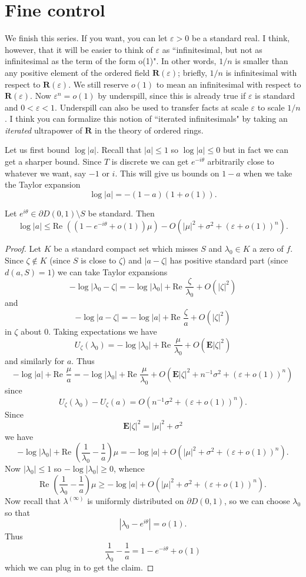 \documentclass[12pt]{article}
\begin{document}
\section{Fine control}
We finish this series.
If you want, you can let $\varepsilon > 0$ be a standard real.
I think, however, that it will be easier to think of $\varepsilon$ as ``infinitesimal, but not as infinitesimal as the term of the form o(1)".
In other words, $1/n$ is smaller than any positive element of the ordered field $\mathbf R(\varepsilon)$; briefly, $1/n$ is infinitesimal with respect to $\mathbf R(\varepsilon)$.
We still reserve $o(1)$ to mean an infinitesimal with respect to $\mathbf R(\varepsilon)$.
Now $\varepsilon^n = o(1)$ by underspill, since this is already true if $\varepsilon$ is standard and $0 < \varepsilon < 1$.
Underspill can also be used to transfer facts at scale $\varepsilon$ to scale $1/n$.
I think you can formalize this notion of ``iterated infinitesimals" by taking an \emph{iterated} ultrapower of $\mathbf R$ in the theory of ordered rings.

Let us first bound $\log |a|$. Recall that $|a| \leq 1$ so $\log |a| \leq 0$ but in fact we can get a sharper bound.
Since $T$ is discrete we can get $e^{-i\theta}$ arbitrarily close to whatever we want, say $-1$ or $i$.
This will give us bounds on $1 - a$ when we take the Taylor expansion
$$\log|a| = -(1 - a)(1 + o(1)).$$
\begin{lemma}
Let $e^{i\theta} \in \partial D(0, 1) \setminus S$ be standard. Then
$$\log |a| \leq \text{Re } ((1 - e^{-i\theta} + o(1))\mu) - O(|\mu|^2 + \sigma^2 + (\varepsilon + o(1))^n).$$
\end{lemma}
\begin{proof}
Let $K$ be a standard compact set which misses $S$ and $\lambda_0 \in K$ a zero of $f$.
Since $\zeta \notin K$ (since $S$ is close to $\zeta$) and $|a-\zeta|$ has positive standard part (since $d(a, S) = 1$) we can take Taylor expansions
$$-\log |\lambda_0 - \zeta| = -\log |\lambda_0| + \text{Re } \frac{\zeta}{\lambda_0} + O(|\zeta|^2)$$
and
$$-\log |a - \zeta| = -\log|a| + \text{Re } \frac{\zeta}{a} + O(|\zeta|^2)$$
in $\zeta$ about $0$. Taking expectations we have
$$U_\zeta(\lambda_0) = -\log |\lambda_0| + \text{Re } \frac{\mu}{\lambda_0} + O(\mathbf E |\zeta|^2)$$
and similarly for $a$. Thus
$$-\log |a| + \text{Re } \frac{\mu}{a} = -\log |\lambda_0| + \text{Re } \frac{\mu}{\lambda_0} + O(\mathbf E |\zeta|^2 + n^{-1}\sigma^2 + (\varepsilon + o(1))^n)$$
since
$$U_\zeta(\lambda_0) - U_\zeta(a) = O(n^{-1}\sigma^2 + (\varepsilon + o(1))^n).$$
Since
$$\mathbf E|\zeta|^2 = |\mu|^2 + \sigma^2$$
we have
$$-\log|\lambda_0| + \text{Re } \left(\frac{1}{\lambda_0} - \frac{1}{a}\right)\mu = -\log|a| + O(|\mu|^2 + \sigma^2 + (\varepsilon + o(1))^n).$$
Now $|\lambda_0| \leq 1$ so $-\log |\lambda_0| \geq 0$, whence
$$\text{Re } \left(\frac{1}{\lambda_0} - \frac{1}{a}\right)\mu \geq -\log|a| + O(|\mu|^2 + \sigma^2 + (\varepsilon + o(1))^n).$$
Now recall that $\lambda^{(\infty)}$ is uniformly distributed on $\partial D(0, 1)$, so we can choose $\lambda_0$ so that
$$|\lambda_0 - e^{i\theta}| = o(1).$$
Thus
$$\frac{1}{\lambda_0} - \frac{1}{a} = 1 - e^{-i\theta} + o(1)$$
which we can plug in to get the claim.
\end{proof}
\end{document}
